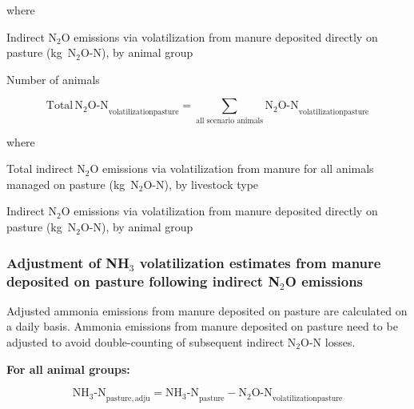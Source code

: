 \noindent where

\begin{description}[font=\normalfont, leftmargin=12em, style=nextline, nosep]
    \item[$\mathrm{N_2O\text{-}N}_{\mathrm{volatilizationpasture}}$]
        Indirect N$_2$O emissions via volatilization from manure deposited
        directly on pasture (kg~N$_2$O-N), by animal group
    \item[$n_{\mathrm{animals}}$] Number of animals
\end{description}

\begin{equation}
    \mathrm{Total\,N_2O\text{-}N}_{\mathrm{volatilizationpasture}}
        = \sum_{\text{all scenario animals}}
          \mathrm{N_2O\text{-}N}_{\mathrm{volatilizationpasture}}
    \tag{Eq.\ 5.4.3-4}
\end{equation}

\noindent where

\begin{description}[font=\normalfont, leftmargin=12em, style=nextline, nosep]
    \item[$\mathrm{Total\,N_2O\text{-}N}_{\mathrm{volatilizationpasture}}$]
        Total indirect N$_2$O emissions via volatilization from manure for all
        animals managed on pasture (kg~N$_2$O-N), by livestock type
    \item[$\mathrm{N_2O\text{-}N}_{\mathrm{volatilizationpasture}}$]
        Indirect N$_2$O emissions via volatilization from manure deposited
        directly on pasture (kg~N$_2$O-N), by animal group
\end{description}

\subsubsection{Adjustment of NH\texorpdfstring{$_3$}{3} volatilization estimates from manure deposited on pasture following indirect N\texorpdfstring{$_2$}{2}O emissions}
\label{subsubsec:grazing-nh3-adjust}

Adjusted ammonia emissions from manure deposited on pasture are calculated on a
daily basis. Ammonia emissions from manure deposited on pasture need to be
adjusted to avoid double-counting of subsequent indirect N$_2$O-N losses.

\bigskip
\noindent\textbf{For all animal groups:}

\begin{equation}
    \mathrm{NH_3\text{-}N}_{\mathrm{pasture,adju}}
        = \mathrm{NH_3\text{-}N}_{\mathrm{pasture}}
          - \mathrm{N_2O\text{-}N}_{\mathrm{volatilizationpasture}}
    \tag{Eq.\ 5.4.3-5}
\end{equation}

